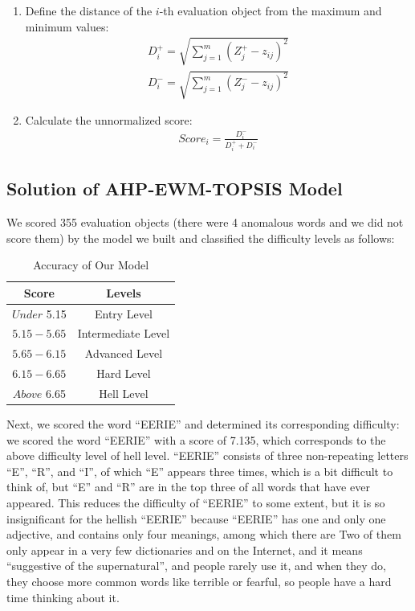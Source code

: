 \documentclass[12pt]{article}  %
\begin{document}
\begin{enumerate}
\item Define the distance of the $i$-th evaluation object from the maximum and minimum values:
\begin{eqnarray}
D_i^+=\sqrt{\sum_{j=1}^{m}(Z_j^+-z_{ij})^2}
\end{eqnarray}
\begin{eqnarray}
D_i^-=\sqrt{\sum_{j=1}^{m}(Z_j^--z_{ij})^2}
\end{eqnarray}
\item Calculate the unnormalized score:
\begin{eqnarray}
Score_i=\frac{D_i^-}{D_i^++D_i^-}
\end{eqnarray}
\end{enumerate}
\subsection{Solution of AHP-EWM-TOPSIS Model}
We scored 355 evaluation objects (there were 4 anomalous words and we did not score them) by the model we built and classified the difficulty levels as follows:
\begin{table}[!h]
\begin{center}
\caption{Accuracy of Our Model}\label{acc}
\begin{tabular}{cc}
\hline
Score&Levels\\\hline
$Under$ 5.15&Entry Level\\
$5.15-5.65$&Intermediate Level\\
$5.65-6.15$&Advanced Level\\
$6.15-6.65$&Hard Level\\
$Above$ 6.65&Hell Level\\\hline
\end{tabular}
\end{center}
\end{table}

Next, we scored the word ``EERIE'' and determined its corresponding difficulty: we scored the word ``EERIE'' with a score of 7.135, which corresponds to the above difficulty level of hell level. ``EERIE'' consists of three non-repeating letters ``E'', ``R'', and ``I'', of which ``E'' appears three times, which is a bit difficult to think of, but ``E'' and ``R'' are in the top three of all words that have ever appeared. This reduces the difficulty of ``EERIE'' to some extent, but it is so insignificant for the hellish ``EERIE'' because ``EERIE'' has one and only one adjective, and contains only four meanings, among which there are Two of them only appear in a very few dictionaries and on the Internet, and it means ``suggestive of the supernatural'', and people rarely use it, and when they do, they choose more common words like terrible or fearful, so people have a hard time thinking about it.
\end{document}
